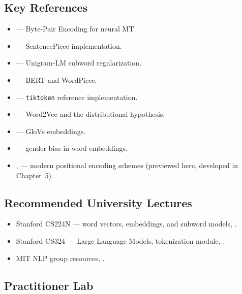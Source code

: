 \subsection{Key References}

\begin{itemize}
  \item \citet{sennrich2016bpe} --- Byte-Pair Encoding for neural MT.
  \item \citet{kudo2018sentencepiece} --- SentencePiece implementation.
  \item \citet{kudo2018unigram} --- Unigram-LM subword regularization.
  \item \citet{devlin2019bert} --- BERT and WordPiece.
  \item \citet{openai_tiktoken} --- \texttt{tiktoken} reference
        implementation.
  \item \citet{mikolov2013efficient,mikolov2013distributed} ---
        Word2Vec and the distributional hypothesis.
  \item \citet{pennington2014glove} --- GloVe embeddings.
  \item \citet{bolukbasi2016man} --- gender bias in word embeddings.
  \item \citet{su2021rope}, \citet{press2022alibi} --- modern
        positional encoding schemes (previewed here, developed in
        Chapter~5).
\end{itemize}

\subsection{Recommended University Lectures}

\begin{itemize}
  \item Stanford CS224N --- word vectors, embeddings, and subword
        models, \citet{stanford_cs224n}.
  \item Stanford CS324 --- Large Language Models, tokenization
        module, \citet{stanford_cs324}.
  \item MIT NLP group resources, \citet{mit_nlp}.
\end{itemize}

\subsection{Practitioner Lab}

